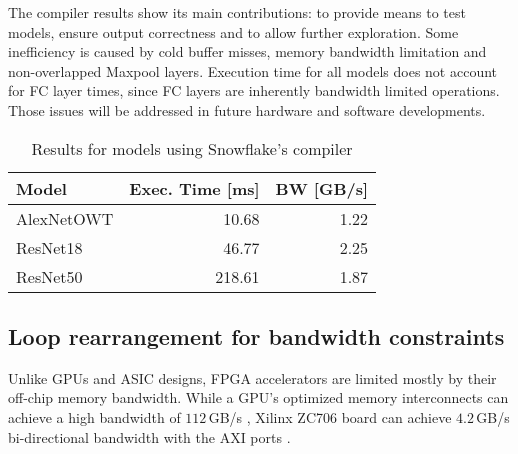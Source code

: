 \documentclass{sig-alternate}
\begin{document}

The compiler results show its main contributions: to provide means to test models, ensure output correctness and to allow further exploration. Some inefficiency is caused by cold buffer misses, memory bandwidth limitation and non-overlapped Maxpool layers. Execution time for all models does not account for FC layer times, since FC layers are inherently bandwidth limited operations. Those issues will be addressed in future hardware and software developments.

\begin{table}[h]
\centering
\caption{Results for models using Snowflake's compiler}
\label{tab:models}
\begin{tabular}{|l|r|r|}
\hline
 Model & Exec. Time {[}ms{]} & BW {[}GB/s{]} \\\hline
AlexNetOWT & 10.68 & 1.22 \\\hline
ResNet18 & 46.77 & 2.25 \\\hline
ResNet50 & 218.61 & 1.87 \\\hline
\end{tabular}
\end{table}

\subsection{Loop rearrangement for bandwidth constraints}\label{ssec:kmloop}
Unlike GPUs and ASIC designs, FPGA accelerators are limited mostly by their off-chip memory bandwidth. While a GPU's optimized memory interconnects can achieve a high bandwidth of $112$\,GB/s \cite{gpunvidia}, Xilinx ZC706 board \cite{xilinx:ZC706} can achieve $4.2$\,GB/s bi-directional bandwidth with the AXI ports \cite{xilinx:axis4lite}.
\end{document}
